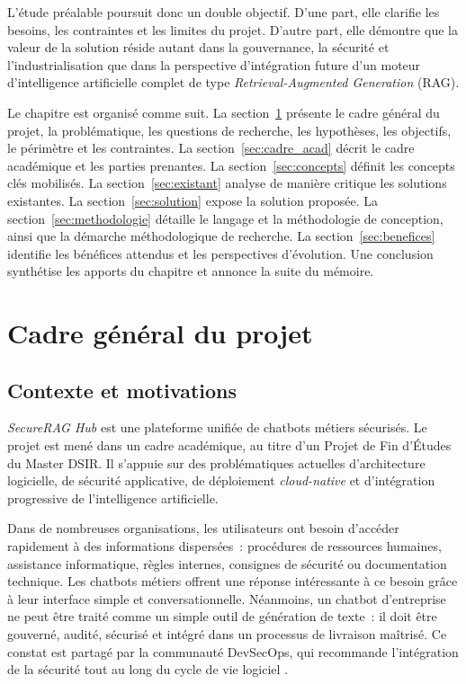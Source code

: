 L'étude préalable poursuit donc un double objectif. D'une part, elle clarifie les besoins, les contraintes et les limites du projet. D'autre part, elle démontre que la valeur de la solution réside autant dans la gouvernance, la sécurité et l'industrialisation que dans la perspective d'intégration future d'un moteur d'intelligence artificielle complet de type \textit{Retrieval-Augmented Generation} (RAG).

Le chapitre est organisé comme suit. La section~\ref{sec:cadre_general} présente le cadre général du projet, la problématique, les questions de recherche, les hypothèses, les objectifs, le périmètre et les contraintes. La section~\ref{sec:cadre_acad} décrit le cadre académique et les parties prenantes. La section~\ref{sec:concepts} définit les concepts clés mobilisés. La section~\ref{sec:existant} analyse de manière critique les solutions existantes. La section~\ref{sec:solution} expose la solution proposée. La section~\ref{sec:methodologie} détaille le langage et la méthodologie de conception, ainsi que la démarche méthodologique de recherche. La section~\ref{sec:benefices} identifie les bénéfices attendus et les perspectives d'évolution. Une conclusion synthétise les apports du chapitre et annonce la suite du mémoire.

\section{Cadre général du projet}
\label{sec:cadre_general}

\subsection{Contexte et motivations}

\textit{SecureRAG Hub} est une plateforme unifiée de chatbots métiers sécurisés. Le projet est mené dans un cadre académique, au titre d'un Projet de Fin d'Études du Master DSIR. Il s'appuie sur des problématiques actuelles d'architecture logicielle, de sécurité applicative, de déploiement \textit{cloud-native} et d'intégration progressive de l'intelligence artificielle.

Dans de nombreuses organisations, les utilisateurs ont besoin d'accéder rapidement à des informations dispersées~: procédures de ressources humaines, assistance informatique, règles internes, consignes de sécurité ou documentation technique. Les chatbots métiers offrent une réponse intéressante à ce besoin grâce à leur interface simple et conversationnelle. Néanmoins, un chatbot d'entreprise ne peut être traité comme un simple outil de génération de texte~: il doit être gouverné, audité, sécurisé et intégré dans un processus de livraison maîtrisé. Ce constat est partagé par la communauté DevSecOps, qui recommande l'intégration de la sécurité tout au long du cycle de vie logiciel \cite{myrbakken_devsecops_2017,nist_ssdf_800218}.

